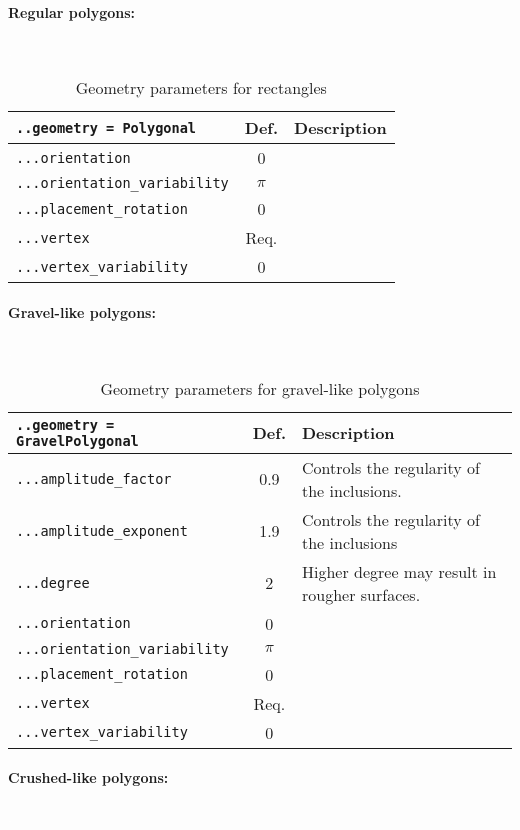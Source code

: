 \documentclass[10pt]{article}
\newcommand{\whiteline}{\textcolor{white}{.\\}}
\begin{document}
\paragraph{Regular polygons:} \whiteline

\begin{table}[h!]
\begin{tabularx}{\textwidth}{lcX}
\verb+..geometry = Polygonal+ & Def. & Description\\
\hline
\verb+...orientation+ & 0 & \\
\verb+...orientation_variability+ & $\pi$ & \\
\verb+...placement_rotation+ & 0 & \\
\verb+...vertex+ &  Req. & \\
\verb+...vertex_variability+ & 0 & \\
\hline
\end{tabularx}
\caption{Geometry parameters for rectangles}
\end{table}

\eject

\paragraph{Gravel-like polygons:} \whiteline

\begin{table}[h!]
\begin{tabularx}{\textwidth}{lcX}
\verb+..geometry = GravelPolygonal+ & Def. & Description\\
\hline
\verb+...amplitude_factor+ & 0.9 & Controls the regularity of the inclusions. \\
\verb+...amplitude_exponent+ & 1.9 & Controls the regularity of the inclusions \\
\verb+...degree+ & 2 & Higher degree may result in rougher surfaces. \\
\verb+...orientation+ & 0 & \\
\verb+...orientation_variability+ & $\pi$ & \\
\verb+...placement_rotation+ & 0 & \\
\verb+...vertex+ &  Req. & \\
\verb+...vertex_variability+ & 0 & \\
\hline
\end{tabularx}
\caption{Geometry parameters for gravel-like polygons}
\end{table}

\paragraph{Crushed-like polygons:} \whiteline
\end{document}
